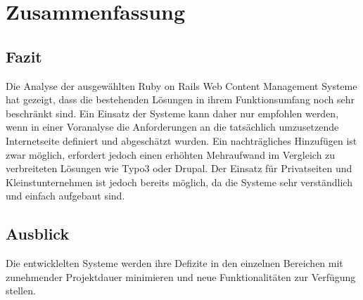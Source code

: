 \chapter{Zusammenfassung}

\section{Fazit}
Die Analyse der ausgewählten Ruby on Rails Web Content Management Systeme hat gezeigt, dass die bestehenden Lösungen in ihrem Funktionsumfang noch sehr beschränkt sind. Ein Einsatz der Systeme kann daher nur empfohlen werden, wenn in einer Voranalyse die Anforderungen an die tatsächlich umzusetzende Internetseite definiert und abgeschätzt wurden. Ein nachträgliches Hinzufügen ist zwar möglich, erfordert jedoch einen erhöhten Mehraufwand im Vergleich zu verbreiteten Lösungen wie Typo3 oder Drupal.
Der Einsatz für Privatseiten und Kleinstunternehmen ist jedoch bereits möglich, da die Systeme sehr verständlich und einfach aufgebaut sind.


\section{Ausblick}
Die entwicklelten Systeme werden ihre Defizite in den einzelnen Bereichen mit zunehmender Projektdauer minimieren und neue Funktionalitäten zur Verfügung stellen.

